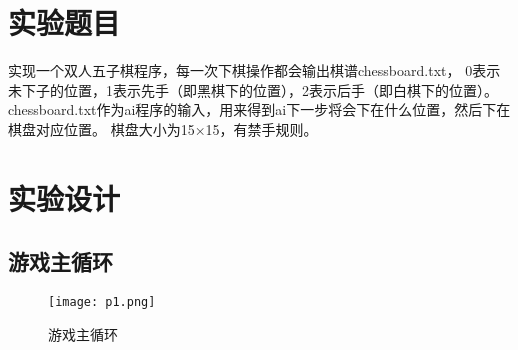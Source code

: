 \documentclass[UTF8,a4paper,12pt]{article}
\begin{document}
\begin{titlepage}
    \begin{center}
        \phantom{Start!}
    	  \vspace{2cm}
        {
            \setlength{\baselineskip}{40pt}
            \vspace{1cm}
        }
    \end{center}
\end{titlepage}

\section{实验题目}
\par 实现一个双人五子棋程序，每一次下棋操作都会输出棋谱chessboard.txt，
0表示未下子的位置，1表示先手（即黑棋下的位置），2表示后手（即白棋下的位置）。
chessboard.txt作为ai程序的输入，用来得到ai下一步将会下在什么位置，然后下在棋盘对应位置。
棋盘大小为15×15，有禁手规则。
\section{实验设计}
\subsection{游戏主循环}
\begin{figure}[h]
\begin{center}
\texttt{[image: p1.png]} %
\caption{游戏主循环}
\end{center}
\end{figure}
\end{document}
